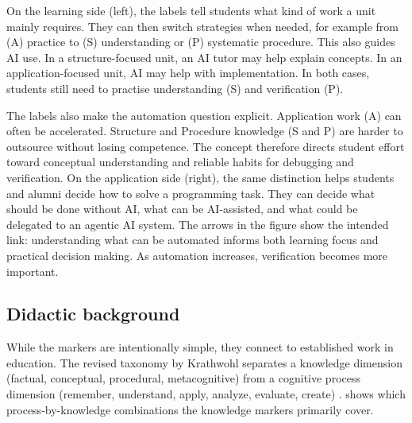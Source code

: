 \documentclass{article}
\begin{document}
On the learning side (left), the labels tell students what kind of work a unit mainly requires. They can then switch strategies when needed, for example from (A) practice to (S) understanding or (P) systematic procedure. This also guides AI use. In a structure-focused unit, an AI tutor may help explain concepts. In an application-focused unit, AI may help with implementation. In both cases, students still need to practise understanding (S) and verification (P).\par
The labels also make the automation question explicit. Application work (A) can often be accelerated. Structure and Procedure knowledge (S and P) are harder to outsource without losing competence. The concept therefore directs student effort toward conceptual understanding and reliable habits for debugging and verification. On the application side (right), the same distinction helps students and alumni decide how to solve a programming task. They can decide what should be done without AI, what can be AI-assisted, and what could be delegated to an agentic AI system. The arrows in the figure show the intended link: understanding what can be automated informs both learning focus and practical decision making. As automation increases, verification becomes more important.


\subsection{Didactic background}

While the markers are intentionally simple, they connect to established work in education. The revised taxonomy by Krathwohl separates a knowledge dimension (factual, conceptual, procedural, metacognitive) from a cognitive process dimension (remember, understand, apply, analyze, evaluate, create) \citep{Krathwohl2002}.  shows which process-by-knowledge combinations the knowledge markers primarily cover.
\end{document}
